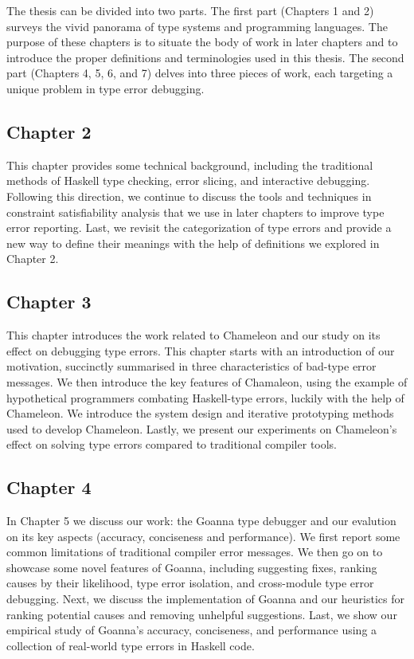 The thesis can be divided into two parts. The first part (Chapters 1 and 2) surveys the vivid panorama of type systems and programming languages. The purpose of these chapters is to situate the body of work in later chapters and to introduce the proper definitions and terminologies used in this thesis.  The second part (Chapters 4, 5, 6, and 7) delves into three pieces of work, each targeting a unique problem in type error debugging.


\subsection{Chapter 2}
This chapter provides some technical background, including the traditional methods of Haskell type checking, error slicing, and interactive debugging. Following this direction, we continue to discuss the tools and techniques in constraint satisfiability analysis that we use in later chapters to improve type error reporting. Last, we revisit the categorization of type errors and provide a new way to define their meanings with the help of definitions we explored in Chapter 2.


\subsection{Chapter 3}
This chapter introduces the work related to Chameleon and our study on its effect on debugging type errors. This chapter starts with an introduction of our motivation, succinctly summarised in three characteristics of bad-type error messages. We then introduce the key features of Chamaleon, using the example of hypothetical programmers combating Haskell-type errors, luckily with the help of Chameleon. We introduce the system design and iterative prototyping methods used to develop Chameleon. Lastly, we present our experiments on Chameleon's effect on solving type errors compared to traditional compiler tools. 


\subsection{Chapter 4}

In Chapter 5 we discuss our work: the Goanna type debugger and our evalution on its key aspects (accuracy, conciseness and performance). We first report some common limitations of traditional compiler error messages. We then go on to showcase some novel features of Goanna, including suggesting fixes, ranking causes by their likelihood, type error isolation, and cross-module type error debugging.  Next, we discuss the implementation of Goanna and our heuristics for ranking potential causes and removing unhelpful suggestions. Last, we show our empirical study of Goanna's accuracy, conciseness, and performance using a collection of real-world type errors in Haskell code. 

